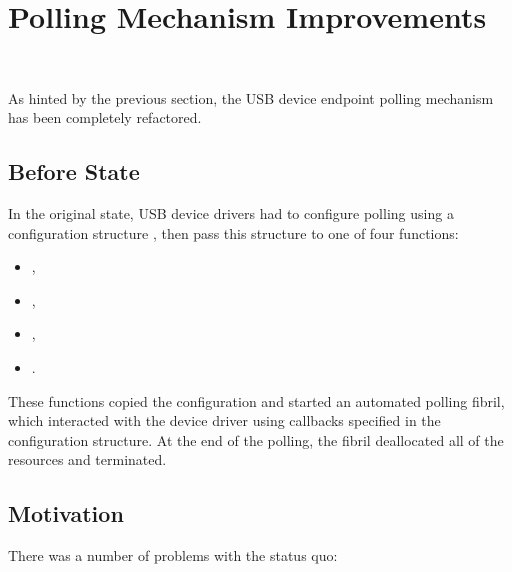 \section{Polling Mechanism Improvements}~\label{polling-refactoring}

As hinted by the previous section, the USB device endpoint polling mechanism has
been completely refactored.


\subsection{Before State}

In the original state, USB device drivers had to configure polling using a
configuration structure , then pass this
structure to one of four functions:

\begin{itemize}
	\item {},
	\item {},
	\item {},
	\item {}.
\end{itemize}

These functions copied the configuration and started an automated polling
fibril, which interacted with the device driver using callbacks specified in the
configuration structure. At the end of the polling, the fibril deallocated all
of the resources and terminated.


\subsection{Motivation}

There was a number of problems with the status quo:

